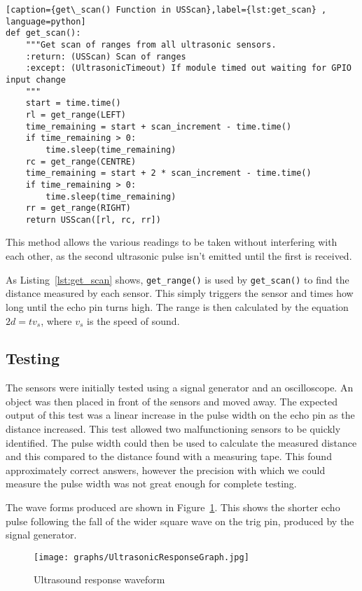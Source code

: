\begin{lstlisting}[caption={get\_scan() Function in USScan},label={lst:get_scan} , language=python]
def get_scan():
    """Get scan of ranges from all ultrasonic sensors.
    :return: (USScan) Scan of ranges
    :except: (UltrasonicTimeout) If module timed out waiting for GPIO input change
    """
    start = time.time()
    rl = get_range(LEFT)
    time_remaining = start + scan_increment - time.time()
    if time_remaining > 0:
        time.sleep(time_remaining)
    rc = get_range(CENTRE)
    time_remaining = start + 2 * scan_increment - time.time()
    if time_remaining > 0:
        time.sleep(time_remaining)
    rr = get_range(RIGHT)
    return USScan([rl, rc, rr])
\end{lstlisting}

This method allows the various readings to be taken without interfering with
each other, as the second ultrasonic pulse isn't emitted until the first is received.

As Listing~\ref{lst:get_scan} shows, \verb|get_range()| is used by
\verb|get_scan()| to find the distance measured by each sensor.
This simply triggers the sensor and times how long until the echo
pin turns high. The range is then calculated by the equation
$ 2d = tv_s$, where $v_s$ is the speed of sound.

\subsection{Testing}\label{elec/range/test}
The sensors were initially tested using a signal generator and an
oscilloscope. An object was then placed in front of the sensors
and moved away. The expected output of this test was a linear increase
in the pulse width on the echo pin as the distance
increased. This test allowed two malfunctioning sensors to be quickly identified. The pulse width could then be used to
calculate the measured distance and this compared to the distance
found with a measuring tape. This found approximately correct answers,
however the precision with which we could measure the pulse width was
not great enough for complete testing.

The wave forms produced are shown in Figure~\ref{UltrasoundWaveform}. This shows the shorter echo pulse following the fall of the wider
square wave on the trig pin, produced by the signal generator.

\begin{figure}[!ht]
	\centering
	\texttt{[image: graphs/UltrasonicResponseGraph.jpg]}
	\caption{Ultrasound response waveform}\label{UltrasoundWaveform}

\end{figure}

